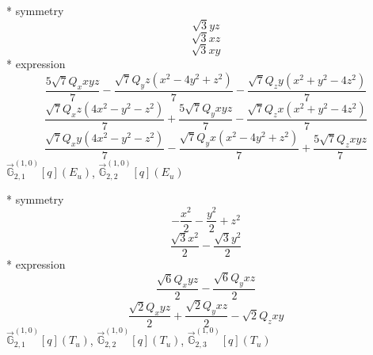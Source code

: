 \documentclass[fleqn,8pt]{jsarticle}
\begin{document}
\noindent\quad ** symmetry
\begin{dmath*}
\sqrt{3} y z
\end{dmath*}
\begin{dmath*}
\sqrt{3} x z
\end{dmath*}
\begin{dmath*}
\sqrt{3} x y
\end{dmath*}
\noindent\quad ** expression
\begin{dmath*}
\frac{5 \sqrt{7} Q_{x} x y z}{7} - \frac{\sqrt{7} Q_{y} z \left(x^{2} - 4 y^{2} + z^{2}\right)}{7} - \frac{\sqrt{7} Q_{z} y \left(x^{2} + y^{2} - 4 z^{2}\right)}{7}
\end{dmath*}
\begin{dmath*}
\frac{\sqrt{7} Q_{x} z \left(4 x^{2} - y^{2} - z^{2}\right)}{7} + \frac{5 \sqrt{7} Q_{y} x y z}{7} - \frac{\sqrt{7} Q_{z} x \left(x^{2} + y^{2} - 4 z^{2}\right)}{7}
\end{dmath*}
\begin{dmath*}
\frac{\sqrt{7} Q_{x} y \left(4 x^{2} - y^{2} - z^{2}\right)}{7} - \frac{\sqrt{7} Q_{y} x \left(x^{2} - 4 y^{2} + z^{2}\right)}{7} + \frac{5 \sqrt{7} Q_{z} x y z}{7}
\end{dmath*}
\noindent\quad $\vec{\mathbb{G}}_{2,1}^{(1,0)}[q](E_{u})$, $\vec{\mathbb{G}}_{2,2}^{(1,0)}[q](E_{u})$

\noindent\quad ** symmetry
\begin{dmath*}
- \frac{x^{2}}{2} - \frac{y^{2}}{2} + z^{2}
\end{dmath*}
\begin{dmath*}
\frac{\sqrt{3} x^{2}}{2} - \frac{\sqrt{3} y^{2}}{2}
\end{dmath*}
\noindent\quad ** expression
\begin{dmath*}
\frac{\sqrt{6} Q_{x} y z}{2} - \frac{\sqrt{6} Q_{y} x z}{2}
\end{dmath*}
\begin{dmath*}
\frac{\sqrt{2} Q_{x} y z}{2} + \frac{\sqrt{2} Q_{y} x z}{2} - \sqrt{2} Q_{z} x y
\end{dmath*}
\noindent\quad $\vec{\mathbb{G}}_{2,1}^{(1,0)}[q](T_{u})$, $\vec{\mathbb{G}}_{2,2}^{(1,0)}[q](T_{u})$, $\vec{\mathbb{G}}_{2,3}^{(1,0)}[q](T_{u})$
\end{document}
